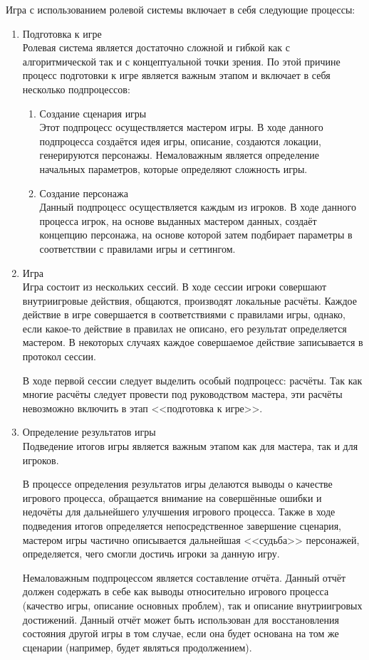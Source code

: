 Игра с использованием ролевой системы \dnd включает в себя следующие процессы:
\begin{enumerate}
\item Подготовка к игре\\
Ролевая система \dnd является достаточно сложной и гибкой как с алгоритмической так и с концептуальной точки зрения. По этой причине процесс подготовки к игре является важным этапом и включает в себя несколько подпроцессов:
\begin{enumerate}
\item Создание сценария игры\\
Этот подпроцесс осуществляется мастером игры. В ходе данного подпроцесса создаётся идея игры, описание, создаются локации, генерируются персонажы. Немаловажным является определение начальных параметров, которые определяют сложность игры.
\item Создание персонажа\\
Данный подпроцесс осуществляется каждым из игроков. В ходе данного процесса игрок, на основе выданных мастером данных, создаёт концепцию персонажа, на основе которой затем подбирает параметры в соответствии с правилами игры и сеттингом.
\end{enumerate}
\item Игра\\
Игра состоит из нескольких сессий. В ходе сессии игроки совершают внутриигровые действия, общаются, производят локальные расчёты. Каждое действие в игре совершается в соответствиями с правилами игры, однако, если какое-то действие в правилах не описано, его результат определяется мастером. В некоторых случаях каждое совершаемое действие записывается в протокол сессии.

В ходе первой сессии следует выделить особый подпроцесс: расчёты. Так как многие расчёты следует провести под руководством мастера, эти расчёты невозможно включить в этап <<подготовка к игре>>.
\item Определение результатов игры\\
Подведение итогов игры является важным этапом как для мастера, так и для игроков.

В процессе определения результатов игры делаются выводы о качестве игрового процесса, обращается внимание на совершённые ошибки и недочёты для дальнейшего улучшения игрового процесса. Также в ходе подведения итогов определяется непосредственное завершение сценария, мастером игры частично описывается дальнейшая <<судьба>> персонажей, определяется, чего смогли достичь игроки за данную игру.

Немаловажным подпроцессом является составление отчёта. Данный отчёт должен содержать в себе как выводы относительно игрового процесса (качество игры, описание основных проблем), так и описание внутриигровых достижений. Данный отчёт может быть использован для восстановления состояния другой игры в том случае, если она будет основана на том же сценарии (например, будет являться продолжением).
\end{enumerate}

